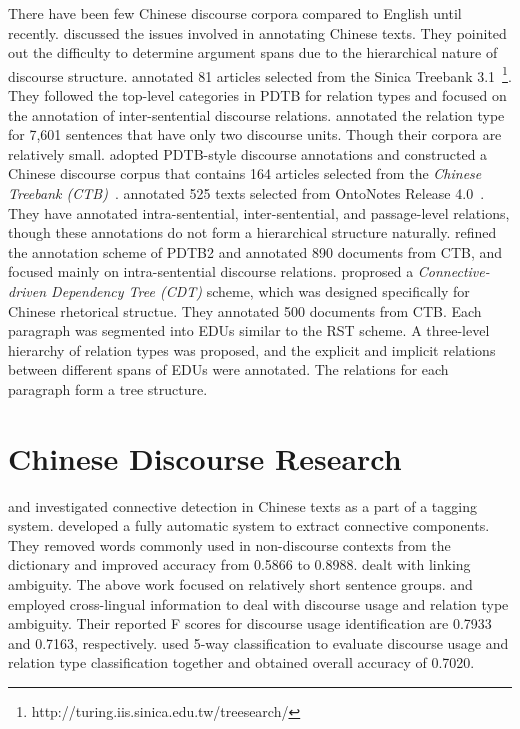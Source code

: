 There have been few Chinese discourse corpora compared to English until recently.
\cite{xue2005annotating} discussed the issues involved in annotating Chinese texts. They
poinited out the difficulty to determine argument spans due to the hierarchical nature
of discourse structure. \cite{huang2011chinese} annotated 81 articles selected from
the Sinica Treebank 3.1~\footnote{http://turing.iis.sinica.edu.tw/treesearch/}. They followed
the top-level categories in PDTB for relation types and focused on the annotation
of inter-sentential discourse relations. \cite{huang2014interpretation} annotated the
relation type for 7,601 sentences that have only two discourse units. Though their
corpora are relatively small.
\cite{zhou2012pdtb,zhou2015the} adopted PDTB-style discourse annotations and constructed
a Chinese discourse corpus that contains 164 articles selected from the \textit{Chinese
Treebank (CTB)}~\citep{xue2005penn}. \cite{zhang2014chinese} annotated 525 texts selected
from OntoNotes Release 4.0~\citep{weischedel_ontonotes_2011}. They have annotated
intra-sentential, inter-sentential, and passage-level relations, though
these annotations do not form a hierarchical structure naturally. \cite{zhou2014the}
refined the annotation scheme of PDTB2 and annotated 890 documents from CTB,
and focused mainly on intra-sentential discourse relations.
\cite{li2014building} proprosed a \textit{Connective-driven Dependency Tree (CDT)}
scheme, which was designed specifically for Chinese rhetorical structue. They
annotated 500 documents from CTB. Each paragraph was segmented into EDUs similar
to the RST scheme. A three-level hierarchy of relation types was
proposed, and the explicit and implicit relations between different spans of EDUs
were annotated. The relations for each paragraph form a tree structure.


\section{Chinese Discourse Research}


\cite{t1999applying,t2000enhancement} and \cite{chan2000mining} investigated
connective detection in Chinese texts as a part of a tagging system. \cite{hu2009research}
developed a fully automatic system to extract connective components.
They removed words commonly used in non-discourse contexts from the dictionary
and improved accuracy from 0.5866 to 0.8988.
\cite{hu2011research} dealt with linking ambiguity.
The above work focused on relatively short sentence groups.
\cite{zhou2012cross} and \cite{li2014cross} employed
cross-lingual information to deal with discourse usage and relation type ambiguity.
Their reported F scores for discourse usage identification are 0.7933 and 0.7163, respectively.
\cite{li2014cross} used 5-way classification to evaluate discourse usage
and relation type classification together and obtained overall accuracy of 0.7020.

